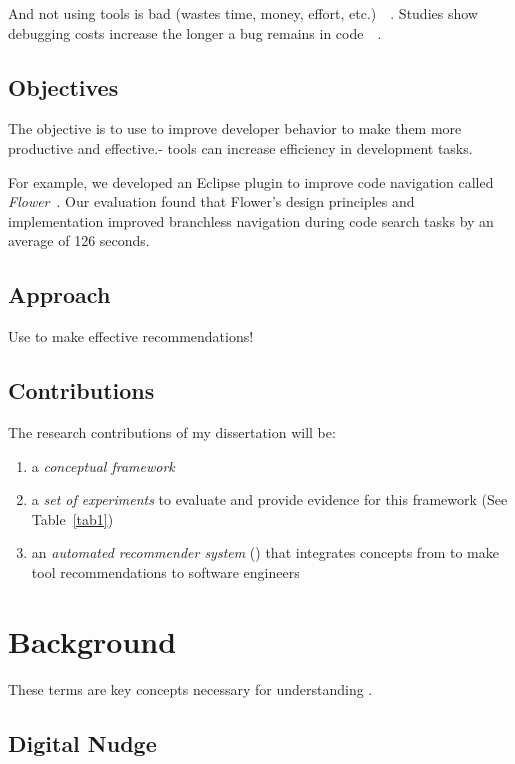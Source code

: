 \documentclass[runningheads]{llncs}
\begin{document}
And not using tools is bad (wastes time, money, effort, etc.)~\cite{SoftwareFailWatch}~\cite{NIST}. Studies show debugging costs increase the longer a bug remains in code~\cite{SEEconomics}~\cite{SoftwareAssuranceSDLC}.

\subsection{Objectives}
The objective is to use \concept to improve developer behavior to make them more productive and effective.- tools can increase efficiency in development tasks. 

For example, we developed an Eclipse plugin to improve code navigation called \textsl{Flower}~\cite{Flower}. Our evaluation found that Flower's design principles and implementation improved branchless navigation during code search tasks by an average of 126 seconds.

\subsection{Approach}
Use \concept to make effective recommendations!

\subsection{Contributions}
The research contributions of my dissertation will be:
\begin{enumerate}
  \item a \emph{conceptual framework} \concept
  \item a \emph{set of experiments} to evaluate and provide evidence for this framework (See Table~\ref{tab1})
  \item an \emph{automated recommender system} (\TOOL) that integrates concepts from \concept to make tool recommendations to software engineers
\end{enumerate}

\section{Background}

These terms are key concepts necessary for understanding \concept.

\subsection{Digital Nudge}
\end{document}

